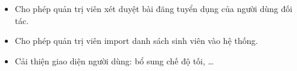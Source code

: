 \documentclass[./../main.tex]{subfiles}
\begin{document}
\begin{itemize}
    \item Cho phép quản trị viên xét duyệt bài đăng tuyển dụng của người dùng đối tác.
    \item Cho phép quản trị viên import danh sách sinh viên vào hệ thống.
    \item Cải thiện giao diện người dùng: bổ sung chế độ tối, \ldots{}
\end{itemize}
\end{document}
